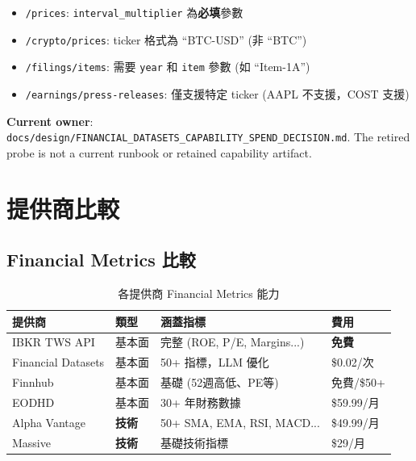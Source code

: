 \documentclass[11pt,a4paper]{article}
\begin{document}
\begin{tcolorbox}[colback=successgreen!5,colframe=successgreen,title={API 參數注意事項}]
\begin{itemize}[leftmargin=*]
    \item \texttt{/prices}: \texttt{interval\_multiplier} 為\textbf{必填}參數
    \item \texttt{/crypto/prices}: ticker 格式為 ``BTC-USD'' (非 ``BTC'')
    \item \texttt{/filings/items}: 需要 \texttt{year} 和 \texttt{item} 參數 (如 ``Item-1A'')
    \item \texttt{/earnings/press-releases}: 僅支援特定 ticker (AAPL 不支援，COST 支援)
\end{itemize}
\end{tcolorbox}

\textbf{Current owner}:
\texttt{docs/design/FINANCIAL\_DATASETS\_CAPABILITY\_SPEND\_DECISION.md}.
The retired probe is not a current runbook or retained capability artifact.

\newpage
\section{提供商比較}

\subsection{Financial Metrics 比較}

\begin{table}[H]
\centering
\caption{各提供商 Financial Metrics 能力}
\small
\begin{tabular}{@{}llll@{}}
\toprule
\textbf{提供商} & \textbf{類型} & \textbf{涵蓋指標} & \textbf{費用} \\
\midrule
IBKR TWS API & 基本面 & 完整 (ROE, P/E, Margins...) & \textbf{免費} \\
Financial Datasets & 基本面 & 50+ 指標，LLM 優化 & \$0.02/次 \\
Finnhub & 基本面 & 基礎 (52週高低、PE等) & 免費/\$50+ \\
EODHD & 基本面 & 30+ 年財務數據 & \$59.99/月 \\
\midrule
Alpha Vantage & \textbf{技術} & 50+ SMA, EMA, RSI, MACD... & \$49.99/月 \\
Massive & \textbf{技術} & 基礎技術指標 & \$29/月 \\
\bottomrule
\end{tabular}
\end{table}
\end{document}
